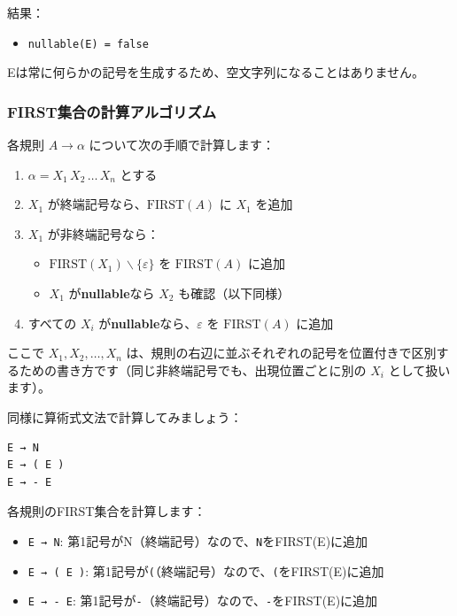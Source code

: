 結果：

\begin{itemize}
\tightlist
\item
  \texttt{nullable(E)\ =\ false}
\end{itemize}

Eは常に何らかの記号を生成するため、空文字列になることはありません。

\hypertarget{chapter5-firstux96c6ux5408ux306eux8a08ux7b97ux30a2ux30ebux30b4ux30eaux30baux30e0}{%
\subsubsection{FIRST集合の計算アルゴリズム}\label{chapter5-firstux96c6ux5408ux306eux8a08ux7b97ux30a2ux30ebux30b4ux30eaux30baux30e0}}

各規則 \(A \to \alpha\) について次の手順で計算します：

\begin{enumerate}
\def\labelenumi{\arabic{enumi}.}
\tightlist
\item
  \(\alpha = X_1\,X_2\,\ldots\,X_n\) とする
\item
  \(X_1\) が終端記号なら、\(\mathrm{FIRST}(A)\) に \(X_1\) を追加
\item
  \(X_1\) が非終端記号なら：

  \begin{itemize}
  \tightlist
  \item
    \(\mathrm{FIRST}(X_1) \mathbin{\backslash} \{\varepsilon\}\) を
    \(\mathrm{FIRST}(A)\) に追加
  \item
    \(X_1\) が\textbf{nullable}なら \(X_2\) も確認（以下同様）
  \end{itemize}
\item
  すべての \(X_i\) が\textbf{nullable}なら、\(\varepsilon\) を
  \(\mathrm{FIRST}(A)\) に追加
\end{enumerate}

ここで \(X_1, X_2, \ldots, X_n\)
は、規則の右辺に並ぶそれぞれの記号を位置付きで区別するための書き方です（同じ非終端記号でも、出現位置ごとに別の
\(X_i\) として扱います）。

同様に算術式文法で計算してみましょう：

\begin{verbatim}
E → N
E → ( E )
E → - E
\end{verbatim}

各規則のFIRST集合を計算します：

\begin{itemize}
\tightlist
\item
  \texttt{E\ →\ N}:
  第1記号がN（終端記号）なので、\texttt{N}をFIRST(E)に追加
\item
  \texttt{E\ →\ (\ E\ )}:
  第1記号が\texttt{(}（終端記号）なので、\texttt{(}をFIRST(E)に追加
\item
  \texttt{E\ →\ -\ E}:
  第1記号が\texttt{-}（終端記号）なので、\texttt{-}をFIRST(E)に追加
\end{itemize}

